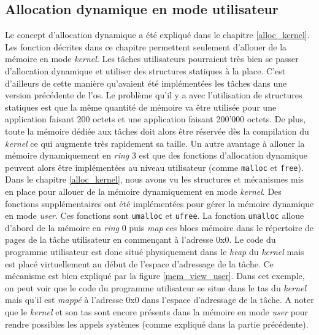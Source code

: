 
\subsection{Allocation dynamique en mode utilisateur}
\label{alloc_user}
Le concept d'allocation dynamique a été expliqué dans le chapitre \ref{alloc_kernel}.
Les fonction décrites dans ce chapitre permettent seulement d'allouer de la mémoire
en mode \textit{kernel}. Les tâches utilisateurs pourraient très bien se passer
d'allocation dynamique et utiliser des structures statiques à la place. C'est
d'ailleurs de cette manière qu'avaient été implémentées les tâches dans une version
précédente de l'\acrshort{os}. Le problème qu'il y a avec l'utilisation de structures
statiques est que la même quantité de mémoire va être utilisée pour une application
faisant 200 octets et une application faisant 200'000 octets. De plus, toute la
mémoire dédiée aux tâches doit alors être réservée dès la compilation du \textit{kernel}
ce qui augmente très rapidement sa taille. Un autre avantage à allouer la mémoire
dynamiquement en \textit{ring} 3 est que des fonctions d'allocation dynamique 
peuvent alors être implémentées au niveau utilisateur (comme \texttt{malloc}
et \texttt{free}). \\

Dans le chapitre \ref{alloc_kernel}, nous avons vu les structures et mécanismes
mis en place pour allouer de la mémoire dynamiquement en mode \textit{kernel}.
Des fonctions supplémentaires ont été implémentées pour gérer la mémoire dynamique en
mode \textit{user}. Ces fonctions sont \texttt{umalloc} et
\texttt{ufree}. La fonction \texttt{umalloc} alloue d'abord
de la mémoire en \textit{ring} 0 puis \textit{map} ces blocs mémoire
dans le répertoire de pages de la tâche utilisateur en commençant à l'adresse 0x0.
Le code du programme utilisateur est donc situé physiquement dans le \textit{heap}
du \textit{kernel} mais est placé virtuellement au début de l'espace d'adressage
de la tâche. Ce mécanisme est bien expliqué par la figure \ref{mem_view_user}.
Dans cet exemple, on peut voir que le code du programme utilisateur se situe
dans le tas du \textit{kernel} mais qu'il est \textit{mappé} à l'adresse 0x0
dans l'espace d'adressage de la tâche. A noter que le \textit{kernel} et son tas
sont encore présents dans la mémoire en mode \textit{user} pour rendre possibles
les appels systèmes (comme expliqué dans la partie précédente).

